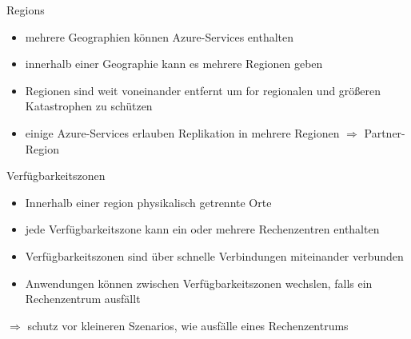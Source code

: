 

\begin{flashcard}[]{Regions}
  \begin{itemize}
    \item mehrere Geographien können Azure-Services enthalten
    \item innerhalb einer Geographie kann es mehrere Regionen geben
    \item Regionen sind weit voneinander entfernt um for regionalen und größeren Katastrophen zu schützen
    \item einige Azure-Services erlauben Replikation in mehrere Regionen\newline
      $\Rightarrow$ Partner-Region
  \end{itemize}
\end{flashcard}

\begin{flashcard}[]{Verfügbarkeitszonen}
  \begin{itemize}
    \item Innerhalb einer region physikalisch getrennte Orte
    \item jede Verfügbarkeitszone kann ein oder mehrere Rechenzentren enthalten
    \item Verfügbarkeitszonen sind über schnelle Verbindungen miteinander verbunden
    \item Anwendungen können zwischen Verfügbarkeitszonen wechslen, falls ein Rechenzentrum ausfällt
  \end{itemize}
  $\Rightarrow$ schutz vor kleineren Szenarios, wie ausfälle eines Rechenzentrums
\end{flashcard}

